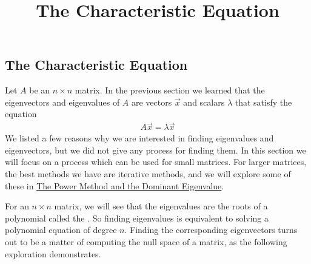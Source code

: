\documentclass{ximera}
\title{The Characteristic Equation} \license{CC BY-NC-SA 4.0}
\begin{document}
\begin{abstract}

\end{abstract}
\maketitle

\begin{onlineOnly}
\section*{The Characteristic Equation}
\end{onlineOnly}

Let $A$ be an $n \times n$ matrix.  In the previous section we learned that the eigenvectors and eigenvalues of $A$ are vectors $\vec{x}$ and scalars $\lambda$ that satisfy the equation  
\begin{align}\label{def:eigen} A \vec{x} = \lambda \vec{x}\end{align}
We listed a few reasons why we are interested in finding eigenvalues and eigenvectors, but we did not give any process for finding them.  In this section we will focus on a process which can be used for small matrices.  For larger matrices, the best methods we have are iterative methods, and we will explore some of these in \href{https://ximera.osu.edu/linearalgebradzv3/LinearAlgebraInteractiveIntro/EIG-0070/main}{The Power Method and the Dominant Eigenvalue}.

For an $n \times n$ matrix, we will see that the eigenvalues are the roots of a polynomial called the .  So finding eigenvalues is equivalent to solving a polynomial equation of degree $n$.  Finding the corresponding eigenvectors turns out to be a matter of computing the null space of a matrix, as the following exploration demonstrates.
\end{document}
